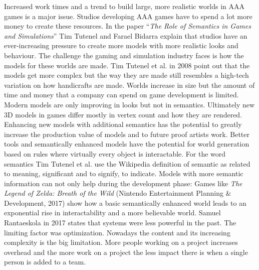 \documentclass[10pt,a4paper]{article}
\begin{document}
\begin{multicols}{2}
Increased work times and a trend to build large, more realistic worlds in AAA games is a major issue. Studios developing AAA games have to spend a lot more money to create these resources. In the paper “\textit{The Role of Semantics in Games and Simulations}” Tim Tutenel and Farael Bidarra explain that studios have an ever-increasing pressure to create more models with more realistic looks and behaviour. The challenge the gaming and simulation industry faces is how the models for these worlds are made. Tim Tutenel et al. in 2008 point out that the models get more complex but the way they are made still resembles a high-tech variation on how handicrafts are made\cite{Tutenel2008}. Worlds increase in size but the amount of time and money that a company can spend on game development is limited. Modern models are only improving in looks but not in semantics\cite{Tutenel2008}. Ultimately new 3D models in games differ mostly in vertex count and how they are rendered. Enhancing new models with additional semantics has the potential to greatly increase the production value of models and to future proof artists work. Better tools and semantically enhanced models have the potential for world generation based on rules where virtually every object is interactable. For the word semantics Tim Tutenel et al. use the Wikipedia definition of semantic as related to meaning, significant and to signify, to indicate\cite{Wikipediacontributors2019, Tutenel2008}. Models with more semantic information can not only help during the development phase: Games like \textit{The Legend of Zelda: Breath of the Wild} (Nintendo Entertainment Planning \& Development, 2017) show how a basic semantically enhanced world leads to an exponential rise in interactability and a more believable world. Samuel Rantaeskola in 2017 states that systems were less powerful in the past. The limiting factor was optimization. Nowadays the content and its increasing complexity is the big limitation\cite{Prinke2017}. More people working on a project increases overhead and the more work on a project the less impact there is when a single person is added to a team.

\end{multicols}
\end{document}
